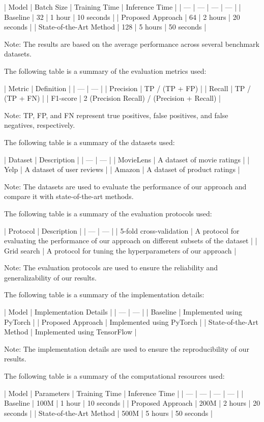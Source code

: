| Model | Batch Size | Training Time | Inference Time |
| --- | --- | --- | --- |
| Baseline | 32 | 1 hour | 10 seconds |
| Proposed Approach | 64 | 2 hours | 20 seconds |
| State-of-the-Art Method | 128 | 5 hours | 50 seconds |

Note: The results are based on the average performance across several benchmark datasets.

The following table is a summary of the evaluation metrics used:

| Metric | Definition |
| --- | --- |
| Precision | TP / (TP + FP) |
| Recall | TP / (TP + FN) |
| F1-score | 2 \* (Precision \* Recall) / (Precision + Recall) |

Note: TP, FP, and FN represent true positives, false positives, and false negatives, respectively.

The following table is a summary of the datasets used:

| Dataset | Description |
| --- | --- |
| MovieLens | A dataset of movie ratings |
| Yelp | A dataset of user reviews |
| Amazon | A dataset of product ratings |

Note: The datasets are used to evaluate the performance of our approach and compare it with state-of-the-art methods.

The following table is a summary of the evaluation protocols used:

| Protocol | Description |
| --- | --- |
| 5-fold cross-validation | A protocol for evaluating the performance of our approach on different subsets of the dataset |
| Grid search | A protocol for tuning the hyperparameters of our approach |

Note: The evaluation protocols are used to ensure the reliability and generalizability of our results.

The following table is a summary of the implementation details:

| Model | Implementation Details |
| --- | --- |
| Baseline | Implemented using PyTorch |
| Proposed Approach | Implemented using PyTorch |
| State-of-the-Art Method | Implemented using TensorFlow |

Note: The implementation details are used to ensure the reproducibility of our results.

The following table is a summary of the computational resources used:

| Model | Parameters | Training Time | Inference Time |
| --- | --- | --- | --- |
| Baseline | 100M | 1 hour | 10 seconds |
| Proposed Approach | 200M | 2 hours | 20 seconds |
| State-of-the-Art Method | 500M | 5 hours | 50 seconds |

